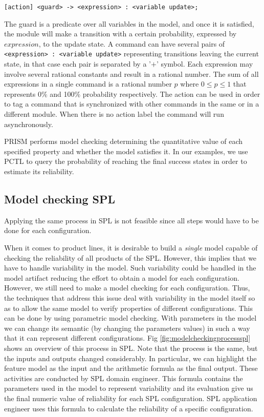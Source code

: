 \documentclass[conference]{IEEEtran}
\begin{document}
	\begin{lstlisting}[caption=PRISM Command,basicstyle=\footnotesize,xleftmargin=0pt,numbers=none,label=lst:prismcommand]
[action] <guard> -> <expression> : <variable update>;
	\end{lstlisting}
	   	
	The guard is a predicate over all variables in the model, and once
	it is satisfied, the module will make a transition with a certain 
	probability, expressed by $expression$, to the update state. A command
	can have several pairs of \texttt{\footnotesize<expression> : <variable update>} 
	representing transitions leaving the current state, in that case
	each pair is separated by a '$+$' symbol. Each
	expression may involve several rational constants and
	result in a rational number. The sum of all expressions in a single
	command is a rational number $p$ where $0 \leq p \leq 1$
	that represents 0\% and 100\% probability respectively. 
	The action can be used in order to tag a command that is synchronized with other
	commands in the same or in a different module. When there is no
	action label the command will run asynchronously. 			  	

	PRISM performs model checking determining the quantitative value of each specified property and
	whether the model satisfies it. In our examples,
	we use PCTL to query the probability of reaching the final success states in
	order to estimate its reliability.							
		
	\subsection{Model checking SPL}
	\label{sec:backspl}
	
	Applying the same process in SPL is not feasible since all
		steps would have to be done for each configuration.
		
		When it comes to product lines, it is desirable to build a \textit{single} model capable of checking the reliability of all
	products of the SPL. However, this implies that we have to handle variability in the model.
	Such variability could be handled in the model artifact reducing the effort to obtain a model for each configuration.
	However, we still need to make a model checking for each configuration. 	
	Thus, the techniques that address this issue deal with variability in the model itself so as
	to allow the same model to verify properties of different configurations. This can be
	done by using parametric model checking. With parameters in the model we can 
	change its semantic (by changing the parameters values) in such a way that it can represent different configurations.			
		Fig \ref{fig:modelcheckingprocessspl} shows an overview of this process in SPL. Note that
	the process is the same, but the inputs and outputs changed considerably. In particular, we can highlight
	the feature model as the input and the arithmetic formula as the final output. These
	activities are conducted by SPL domain engineer.
	This formula contains the parameters used in the model to represent variability and its evaluation give us the final numeric
	value of reliability for each SPL configuration. SPL application engineer uses this formula to calculate
	the reliability of a specific configuration.
	
\end{document}
